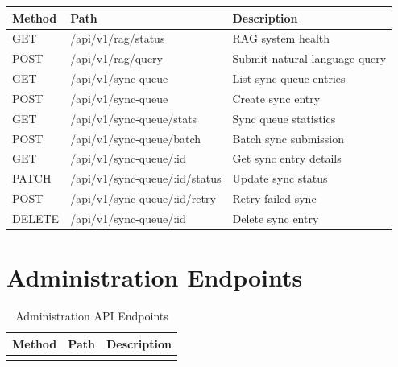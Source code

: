 \documentclass[12pt,a4paper,oneside]{report}
\begin{document}
\begin{appendix}
\begin{longtable}{lll}
\textbf{Method} & \textbf{Path} & \textbf{Description} \\

\endhead

\endfoot

\endlastfoot
GET & /api/v1/rag/status & RAG system health \\
POST & /api/v1/rag/query & Submit natural language query \\
GET & /api/v1/sync-queue & List sync queue entries \\
POST & /api/v1/sync-queue & Create sync entry \\
GET & /api/v1/sync-queue/stats & Sync queue statistics \\
POST & /api/v1/sync-queue/batch & Batch sync submission \\
GET & /api/v1/sync-queue/:id & Get sync entry details \\
PATCH & /api/v1/sync-queue/:id/status & Update sync status \\
POST & /api/v1/sync-queue/:id/retry & Retry failed sync \\
DELETE & /api/v1/sync-queue/:id & Delete sync entry \\
\end{longtable}

\section{Administration Endpoints}
\begin{longtable}{lll}
\caption{Administration API Endpoints} \\

\textbf{Method} & \textbf{Path} & \textbf{Description} \\

\endhead

\endfoot


\end{longtable}
\end{appendix}
\end{document}
